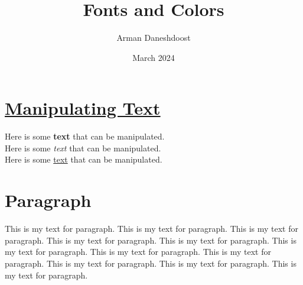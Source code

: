 \documentclass{article}
\title{{\calligra Fonts and Colors}}
\author{{\unclfamily Arman Daneshdoost}}
\date{March 2024}
\begin{document}
	\maketitle
	
	\section* {\color{red} \underline{Manipulating Text}}
	
	{\small Here} is {\color{blue} some} \textbf{text} that can be manipulated.\\
	\textcolor{mynewcolor}{Here} is {\color{OliveGreen} some} \textit{text} that can be {\sffamily manipulated}. \\ %
	{\huge Here} is \textcolor{nextcolor}{some} \underline{text} that can be {\ttfamily manipulated}. %
	
	\section*{Paragraph}
	This is my text for paragraph. 	This is my text for paragraph. 	This is my text for paragraph. 	This is my text for paragraph. 
	This is my text for paragraph. 	This is my text for paragraph. 	This is my text for paragraph. 	This is my text for paragraph. 
	This is my text for paragraph. 	This is my text for paragraph. 	This is my text for paragraph. 
\end{document}
